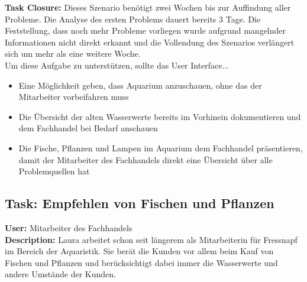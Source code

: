  \textbf{Task Closure:} Dieses Szenario benötigt zwei Wochen bis zur Auffindung aller Probleme. Die Analyse des ersten Problems dauert bereits 3 Tage. Die Feststellung, dass noch mehr Probleme vorliegen wurde aufgrund mangelnder Informationen nicht direkt erkannt und die Vollendung des Szenarios verlängert sich um mehr als eine weitere Woche.\\

Um diese Aufgabe zu unterstützen, sollte das User Interface...
\begin{itemize}
  \item Eine Möglichkeit geben, dass Aquarium anzuschauen, ohne das der Mitarbeiter vorbeifahren muss
  \item Die Übersicht der alten Wasserwerte bereits im Vorhinein dokumentieren und dem Fachhandel bei Bedarf anschauen
  \item Die Fische, Pflanzen und Lampen im Aquarium dem Fachhandel präsentieren, damit der Mitarbeiter des Fachhandels direkt eine Übersicht über alle Problemquellen hat
\end{itemize}

\subsection{Task: Empfehlen von Fischen und Pflanzen}
\textbf{User:} Mitarbeiter des Fachhandels\\

\textbf{Description:} Laura arbeitet schon seit längerem als Mitarbeiterin für Fressnapf im Bereich der Aquaristik. Sie berät die Kunden vor allem beim Kauf von Fischen und Pflanzen und berücksichtigt dabei immer die Wasserwerte und andere Umstände der Kunden.\\

